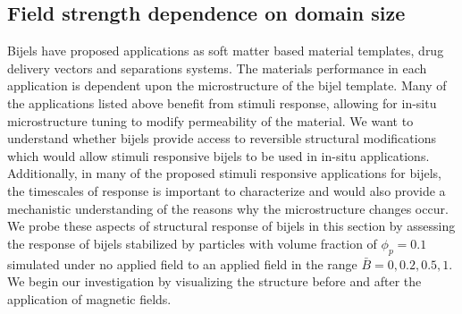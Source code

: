 \subsection{Field strength dependence on domain
size}\label{section:field-strength-dependence-on-domain-size}

Bijels have proposed applications as soft matter based material
templates, drug delivery vectors and separations systems. The materials
performance in each application is dependent upon the microstructure of
the bijel template. Many of the applications listed above benefit from
stimuli response, allowing for in-situ microstructure tuning to modify
permeability of the material. We want to understand whether bijels
provide access to reversible structural modifications which would allow
stimuli responsive bijels to be used in in-situ applications.
Additionally, in many of the proposed stimuli responsive applications
for bijels, the timescales of response is important to characterize and
would also provide a mechanistic understanding of the reasons why the
microstructure changes occur. We probe these aspects of structural
response of bijels in this section by assessing the response of bijels
stabilized by particles with volume fraction of \(\phi_p = 0.1\)
simulated under no applied field to an applied field in the range
\(\bar{B} = 0, 0.2, 0.5, 1\). We begin our investigation by visualizing
the structure before and after the application of magnetic fields.

